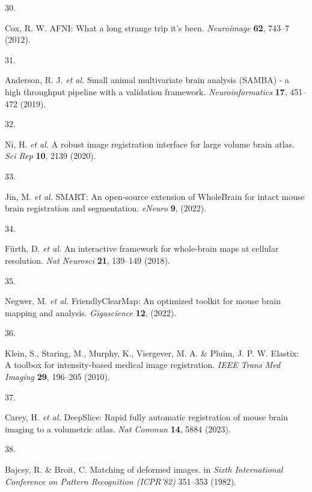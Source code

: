\documentclass[
  12pt,
]{article}
\newlength{\cslhangindent}
\newlength{\csllabelwidth}
\newenvironment{CSLReferences}[2] %
 {%
  \setlength{\parindent}{0pt}
  \ifodd #1 \everypar{\setlength{\hangindent}{\cslhangindent}}\ignorespaces\fi
  \ifnum #2 > 0
  \setlength{\parskip}{#2\baselineskip}
  \fi
 }%
 {}
\newcommand{\CSLLeftMargin}[1]{\parbox[t]{\csllabelwidth}{#1}}
\newcommand{\CSLRightInline}[1]{\parbox[t]{\linewidth - \csllabelwidth}{#1}\break}
\begin{document}
\begin{CSLReferences}{0}{0}
\leavevmode{}%
\CSLLeftMargin{30. }
\CSLRightInline{Cox, R. W. {AFNI}: What a long strange trip it's been.
\emph{Neuroimage} \textbf{62}, 743--7 (2012).}

\leavevmode{}%
\CSLLeftMargin{31. }
\CSLRightInline{Anderson, R. J. \emph{et al.} Small animal multivariate
brain analysis (SAMBA) - a high throughput pipeline with a validation
framework. \emph{Neuroinformatics} \textbf{17}, 451--472 (2019).}

\leavevmode{}%
\CSLLeftMargin{32. }
\CSLRightInline{Ni, H. \emph{et al.} A robust image registration
interface for large volume brain atlas. \emph{Sci Rep} \textbf{10}, 2139
(2020).}

\leavevmode{}%
\CSLLeftMargin{33. }
\CSLRightInline{Jin, M. \emph{et al.} SMART: An open-source extension of
WholeBrain for intact mouse brain registration and segmentation.
\emph{eNeuro} \textbf{9}, (2022).}

\leavevmode{}%
\CSLLeftMargin{34. }
\CSLRightInline{Fürth, D. \emph{et al.} An interactive framework for
whole-brain maps at cellular resolution. \emph{Nat Neurosci}
\textbf{21}, 139--149 (2018).}

\leavevmode{}%
\CSLLeftMargin{35. }
\CSLRightInline{Negwer, M. \emph{et al.} FriendlyClearMap: An optimized
toolkit for mouse brain mapping and analysis. \emph{Gigascience}
\textbf{12}, (2022).}

\leavevmode{}%
\CSLLeftMargin{36. }
\CSLRightInline{Klein, S., Staring, M., Murphy, K., Viergever, M. A. \&
Pluim, J. P. W. Elastix: A toolbox for intensity-based medical image
registration. \emph{IEEE Trans Med Imaging} \textbf{29}, 196--205
(2010).}

\leavevmode{}%
\CSLLeftMargin{37. }
\CSLRightInline{Carey, H. \emph{et al.} DeepSlice: Rapid fully automatic
registration of mouse brain imaging to a volumetric atlas. \emph{Nat
Commun} \textbf{14}, 5884 (2023).}

\leavevmode{}%
\CSLLeftMargin{38. }
\CSLRightInline{Bajcsy, R. \& Broit, C. Matching of deformed images. in
\emph{{S}ixth {I}nternational {C}onference on {P}attern {R}ecognition
({ICPR}'82)} 351--353 (1982).}


\end{CSLReferences}
\end{document}
